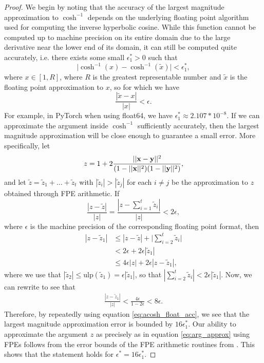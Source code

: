 \begin{proof}
    We begin by noting that the accuracy of the largest magnitude approximation to $\cosh^{-1}$ depends on the underlying floating point algorithm used for computing the inverse hyperbolic cosine. While this function cannot be computed up to machine precision on its entire domain due to the large derivative near the lower end of its domain, it can still be computed quite accurately, i.e. there exists some small $\epsilon_1^* > 0$ such that
    \begin{equation}\label{eq:acosh_float_acc}
        \Big|\cosh^{-1}(x) - \cosh^{-1}(\tilde{x})\Big| < \epsilon_1^*,
    \end{equation}
    where $x \in [1, R]$, where $R$ is the greatest representable number and $\tilde{x}$ is the floating point approximation to $x$, so for which we have
    \begin{equation}
        \frac{|\tilde{x} - x|}{|x|} < \epsilon.
    \end{equation}
    For example, in PyTorch when using float64, we have $\epsilon_1^* \approx 2.107 * 10^{-8}$. If we can approximate the argument inside $\cosh^{-1}$ sufficiently accurately, then the largest magnitude approximation will be close enough to guarantee a small error. More specifically, let
    \begin{equation}
        z = 1 + 2 \frac{||\mathbf{x} - \mathbf{y}||^2}{(1 - ||\mathbf{x}||^2) (1 - ||\mathbf{y}||^2)},
    \end{equation}
    and let $\tilde{z} = \tilde{z}_1 + \ldots + \tilde{z}_t$ with $|\tilde{z}_i| > |\tilde{z}_j|$ for each $i \neq j$ be the approximation to $z$ obtained through FPE arithmetic. If
    \begin{equation}\label{eq:arg_approx}
        \frac{|z - \tilde{z}|}{|z|} = \frac{|z - \sum_{i=1}^t \tilde{z}_i |}{|z|} < 2\epsilon,
    \end{equation}
    where $\epsilon$ is the machine precision of the corresponding floating point format, then
    \begin{align}
        |z - \tilde{z}_1| &\leq |z - \tilde{z}| + \Big| \sum_{i=2}^t \tilde{z}_i \Big| \\
        &< 2 \epsilon + 2 \epsilon |\tilde{z}_1| \\
        &\leq 4\epsilon |z| + 2\epsilon |z - \tilde{z}_1|,
    \end{align}
    where we use that $|\tilde{z}_2| \leq \text{ulp} (\tilde{z}_1) = \epsilon |\tilde{z}_1|$, so that $|\sum_{i=2}^t \tilde{z}_i| < 2\epsilon |\tilde{z}_1|$. Now, we can rewrite to see that
    \begin{align}
        \frac{|z - \tilde{z}_1|}{|z|} < \frac{4 \epsilon}{1 - 2 \epsilon} < 8 \epsilon.
    \end{align}
    Therefore, by repeatedly using equation \ref{eq:acosh_float_acc}, we see that the largest magnitude approximation error is bounded by $16 \epsilon_1^*$. Our ability to approximate the argument $z$ as precisely as in equation \ref{eq:arg_approx} using FPEs follows from the error bounds of the FPE arithmetic routines from \citep{popescu2017towards}. This shows that the statement holds for $\epsilon^* = 16 \epsilon_1^*$.
\end{proof}

